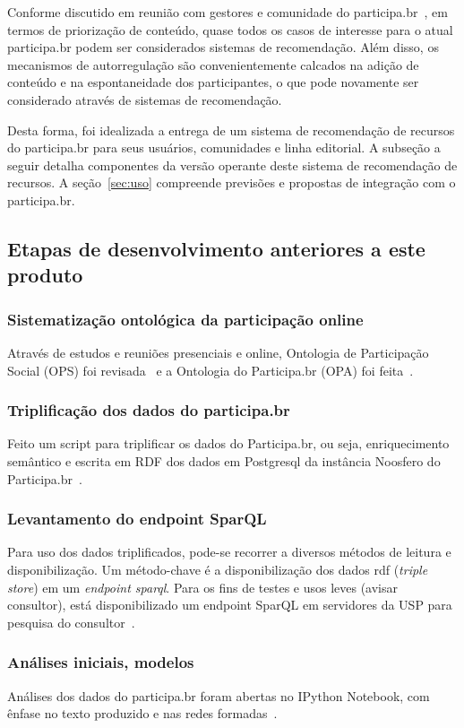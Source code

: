 \documentclass[12pt]{article}
\begin{document}
Conforme discutido em reunião com gestores e comunidade do participa.br~\cite{padProd4}, em termos de priorização de conteúdo, quase todos os casos de interesse para o atual participa.br podem ser considerados sistemas de recomendação. Além disso, os mecanismos de autorregulação são convenientemente calcados na adição de conteúdo e na espontaneidade dos participantes, o que pode novamente ser considerado através de sistemas de recomendação.

Desta forma, foi idealizada a entrega de um sistema de recomendação de recursos do participa.br para seus usuários, comunidades e linha editorial. A subseção a seguir detalha componentes da versão operante deste sistema de recomendação de recursos. A seção~\ref{sec:uso} compreende previsões e propostas de integração com o participa.br.

\subsection{Etapas de desenvolvimento anteriores a este produto}
\subsubsection{Sistematização ontológica da participação online}
Através de estudos e reuniões presenciais e online, Ontologia de Participação Social (OPS) foi revisada~\cite{OPS} e a Ontologia do Participa.br (OPA) foi feita~\cite{OPA}.
\subsubsection{Triplificação dos dados do participa.br}
Feito um script para triplificar os dados do Participa.br, ou seja, enriquecimento semântico e escrita em RDF dos dados em Postgresql da instância Noosfero do Participa.br~\cite{triplifica}.
\subsubsection{Levantamento do endpoint SparQL}
Para uso dos dados triplificados, pode-se recorrer a diversos métodos de leitura e disponibilização. Um método-chave é a disponibilização dos dados rdf (\emph{triple store}) em um \emph{endpoint sparql}. Para os fins de testes e usos leves (avisar consultor), está disponibilizado um endpoint SparQL em servidores da USP para pesquisa do consultor~\cite{endpoint}.
\subsubsection{Análises iniciais, modelos}
Análises dos dados do participa.br foram abertas no IPython Notebook, com ênfase no texto produzido e nas redes formadas~\cite{repoProd3}.
\end{document}
